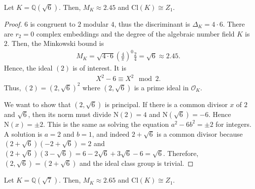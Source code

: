 \begin{exmbox}
    \begin{example}
        Let \(K = \mathbb{Q}(\sqrt{6})\). Then, \(M_K \approx 2.45\) and \(\mathrm{Cl}(K) \cong Z_1\).
    \end{example}
\end{exmbox}
\begin{proof}
    \(6\) is congruent to \(2\) modular \(4\), thus the discriminant is \(\Delta_K = 4 \cdot 6\). There are \(r_2 = 0\) complex embeddings and the degree of the algebraic number field \(K\) is \(2\). Then, the Minkowski bound is
    \begin{align*}
        M_K = \sqrt{4 \cdot 6} \left(\frac{4}{\pi}\right)^0 \frac{2}{4} = \sqrt{6} \approx 2.45 \text{.}
    \end{align*}
    Hence, the ideal \((2)\) is of interest. It is
    \begin{align*}
        X^2 - 6 \equiv X^2 \mod{2} \text{.}
    \end{align*}
    Thus, \((2) = (2, \sqrt{6})^2\) where \((2, \sqrt{6})\) is a prime ideal in \(\mathcal{O}_K\).

    We want to show that \((2, \sqrt{6})\) is principal. If there is a common divisor \(x\) of \(2\) and \(\sqrt{6}\), then its norm must divide \(\mathrm{N}(2) = 4\) and \(\mathrm{N}(\sqrt{6}) = -6\). Hence \(\mathrm{N}(x) = \pm 2\). This is the same as solving the equation \(a^2 - 6b^2 = \pm 2\) for integers. A solution is \(a = 2\) and \(b = 1\), and indeed \(2 + \sqrt{6}\) is a common divisor because \((2 + \sqrt{6})(- 2 + \sqrt{6}) = 2\) and \((2 + \sqrt{6})(3 - \sqrt{6}) = 6 - 2\sqrt{6} + 3\sqrt{6} - 6 = \sqrt{6}\). Therefore, \((2, \sqrt{6}) = (2 + \sqrt{6})\) and the ideal class group is trivial.
\end{proof}

\begin{exmbox}
    \begin{example}
        Let \(K = \mathbb{Q}(\sqrt{7})\). Then, \(M_K \approx 2.65\) and \(\mathrm{Cl}(K) \cong Z_1\).
    \end{example}
\end{exmbox}

